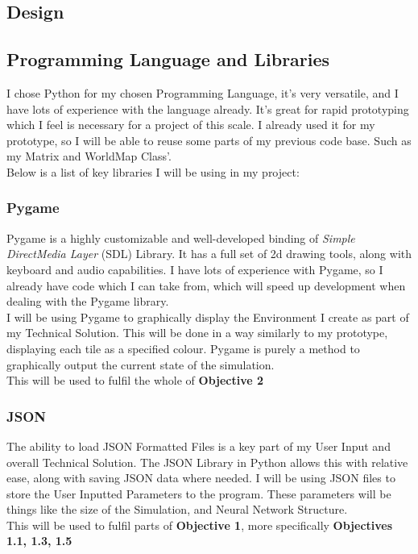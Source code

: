 \begin{flushleft}
    \large
    \section{Design}
        \subsection{Programming Language and Libraries}
            I chose Python for my chosen Programming Language, it's very versatile, and I have lots of experience with the language
            already. It's great for rapid prototyping which I feel is necessary for a project of this scale. I already used it for 
            my prototype, so I will be able to reuse some parts of my previous code base. Such as my Matrix and WorldMap Class'. \\
            \vspace{0.2cm}
            Below is a list of key libraries I will be using in my project: \\
            \subsubsection*{Pygame}
            Pygame is a highly customizable and well-developed binding of \textit{Simple DirectMedia Layer} (SDL) Library. 
            It has a full set of 2d drawing tools, along with keyboard and audio capabilities. I have lots of experience with Pygame, so 
            I already have code which I can take from, which will speed up development when dealing with the Pygame library. \\
            \vspace{0.2cm}
            I will be using Pygame to graphically display the Environment I create as part of my Technical Solution. This
            will be done in a way similarly to my prototype, displaying each tile as a specified colour. Pygame is purely a 
            method to graphically output the current state of the simulation. \\
            \vspace{0.2cm}
            This will be used to fulfil the whole of \textbf{Objective 2} \\
            \subsubsection*{JSON}
            The ability to load JSON Formatted Files is a key part of my User Input and overall Technical Solution. The JSON 
            Library in Python allows this with relative ease, along with saving JSON data where needed. I will be using JSON files
            to store the User Inputted Parameters to the program. These parameters will be things like the size of the Simulation, and 
            Neural Network Structure. \\
            \vspace{0.2cm}
            This will be used to fulfil parts of \textbf{Objective 1}, more specifically \textbf{Objectives 1.1, 1.3, 1.5} \\

\end{flushleft}
